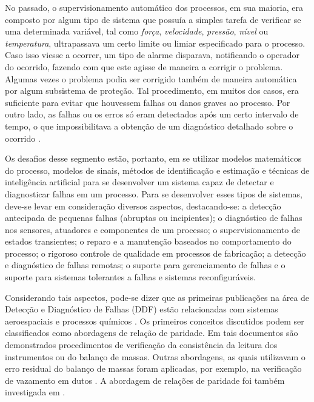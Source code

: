 No passado, o supervisionamento automático dos processos, em sua maioria, era
composto por algum tipo de sistema que possuía a simples tarefa de verificar se
uma determinada variável, tal como {\it força}, {\it velocidade}, {\it pressão},
{\it nível} ou {\it temperatura}, ultrapassava um certo limite ou limiar
especificado para o processo. Caso isso viesse a ocorrer, um tipo de alarme
disparava, notificando o operador do ocorrido, fazendo com que este agisse de
maneira a corrigir o problema. Algumas vezes o problema podia ser corrigido
também de maneira automática por algum subsistema de proteção. Tal procedimento,
em muitos dos casos, era suficiente para evitar que houvessem falhas ou danos
graves ao processo. Por outro lado, as falhas ou os erros só eram detectados
após um certo intervalo de tempo, o que impossibilitava a obtenção de um
diagnóstico detalhado sobre o ocorrido \cite{isermann:2006}.

Os desafios desse segmento estão, portanto, em se utilizar modelos matemáticos
do processo, modelos de sinais, métodos de identificação e estimação e técnicas
de inteligência artificial para se desenvolver um sistema capaz de detectar e
diagnosticar falhas em um processo. Para se desenvolver esses tipos de sistemas,
deve-se levar em consideração diversos aspectos, destacando-se: a detecção
antecipada de pequenas falhas (abruptas ou incipientes); o diagnóstico de falhas
nos sensores, atuadores e componentes de um processo; o supervisionamento de
estados transientes; o reparo e a manutenção baseados no comportamento do
processo; o rigoroso controle de qualidade em processos de fabricação; a
detecção e diagnóstico de falhas remotas; o suporte para gerenciamento de falhas
e o suporte para sistemas tolerantes a falhas e sistemas reconfiguráveis.

Considerando tais aspectos, pode-se dizer que as primeiras publicações na área
de Detecção e Diagnóstico de Falhas (DDF) estão relacionadas com sistemas
aeroespaciais \cite{beard:1971,jones:1973,willsky:1976,clark:1978} e processos
químicos \cite{himmelblau:1978}. Os primeiros conceitos discutidos podem ser
classificados como abordagens de relação de paridade. Em tais documentos são
demonstrados procedimentos de verificação da consistência da leitura dos
instrumentos ou do balanço de massas. Outras abordagens, as quais utilizavam o
erro residual do balanço de massas foram aplicadas, por exemplo, na verificação
de vazamento em dutos \cite{billman:1987}. A abordagem de relações de paridade
foi também investigada em .

